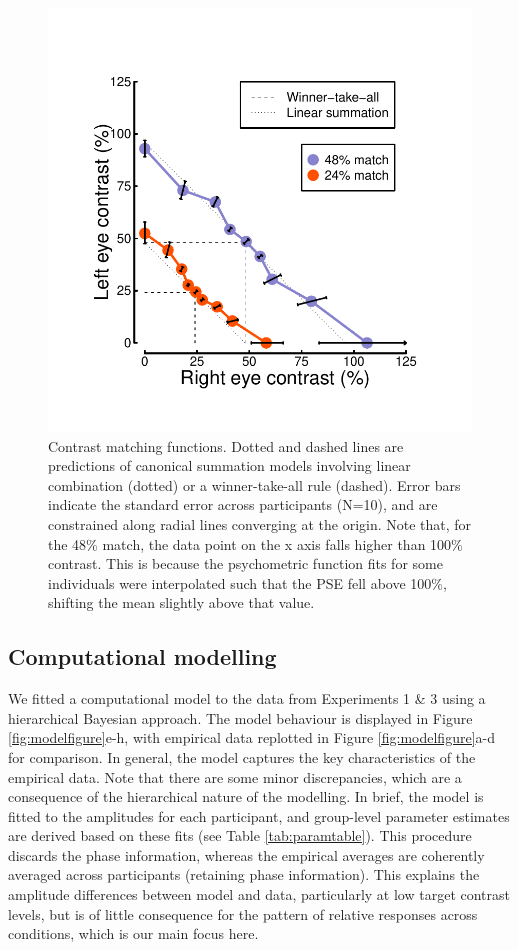 \documentclass[
]{article}
\begin{document}
\begin{figure}

{\centering \includegraphics[width=0.5\linewidth]{Figures/matchingdata} 

}

\caption{Contrast matching functions. Dotted and dashed lines are predictions of canonical summation models involving linear combination (dotted) or a winner-take-all rule (dashed). Error bars indicate the standard error across participants (N=10), and are constrained along radial lines converging at the origin. Note that, for the {48\%} match, the data point on the x axis falls higher than {100\%} contrast. This is because the psychometric function fits for some individuals were interpolated such that the PSE fell above {100\%}, shifting the mean slightly above that value.}\label{fig:matchingdata}
\end{figure}

\hypertarget{computational-modelling}{%
\subsection{Computational modelling}\label{computational-modelling}}

We fitted a computational model to the data from Experiments 1 \& 3 using a hierarchical Bayesian approach. The model behaviour is displayed in Figure \ref{fig:modelfigure}e-h, with empirical data replotted in Figure \ref{fig:modelfigure}a-d for comparison. In general, the model captures the key characteristics of the empirical data. Note that there are some minor discrepancies, which are a consequence of the hierarchical nature of the modelling. In brief, the model is fitted to the amplitudes for each participant, and group-level parameter estimates are derived based on these fits (see Table \ref{tab:paramtable}). This procedure discards the phase information, whereas the empirical averages are coherently averaged across participants (retaining phase information). This explains the amplitude differences between model and data, particularly at low target contrast levels, but is of little consequence for the pattern of relative responses across conditions, which is our main focus here.
\end{document}
